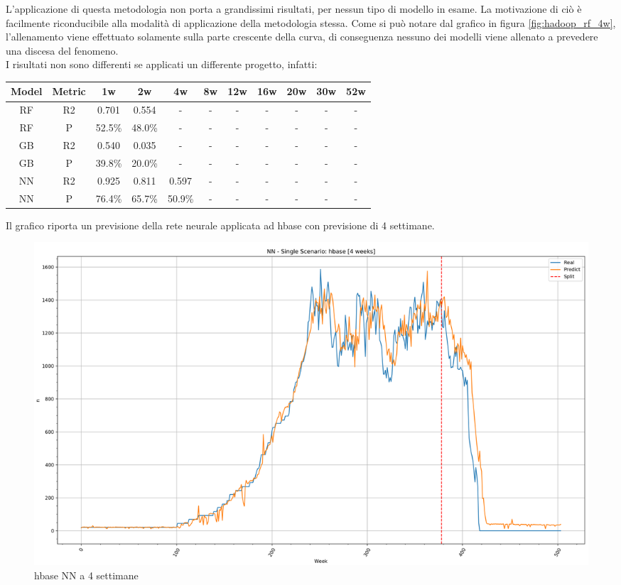 \documentclass[%
    corpo=12pt,
    twoside,
    oldstyle,
    autoretitolo,
    greek,
    evenboxes,
]{toptesi}
\begin{document}
L'applicazione di questa metodologia non porta a grandissimi risultati, per nessun tipo di modello in esame. La motivazione di ciò è facilmente riconducibile alla modalità di applicazione della metodologia stessa. Come si può notare dal grafico in figura \ref{fig:hadoop_rf_4w}, l'allenamento viene effettuato solamente sulla parte crescente della curva, di conseguenza nessuno dei modelli viene allenato a prevedere una discesa del fenomeno.\\
I risultati non sono differenti se applicati un differente progetto, infatti:
\begin{center}
   \label{tab:single_scen_hbase}
  \begin{tabular}{ |c|c|c|c|c|c|c|c|c|c|c| }
    \hline
    \textbf{Model} & \textbf{Metric} & \textbf{1w} & \textbf{2w} & \textbf{4w} & \textbf{8w} & \textbf{12w} & \textbf{16w} & \textbf{20w} & \textbf{30w}  & \textbf{52w} \\
    \hline
    \hline
    RF & R2 & 0.701 & 0.554 & - & - & - & - & - & - & -\\
    \hline
    RF & P & 52.5\% & 48.0\% & - & - & - & - & - & - & -\\
    \hline
    \hline
    GB & R2 & 0.540 & 0.035 & - & - & - & - & - & - & -\\
    \hline
    GB & P & 39.8\% & 20.0\% & - & - & - & - & - & - & -\\
    \hline
    \hline
    NN & R2 & 0.925 & 0.811 & 0.597 & - & - & - & - & - & -\\
    \hline
    NN & P & 76.4\% & 65.7\% & 50.9\% & - & - & - & - & - & -\\
    \hline
  \end{tabular}
\end{center}
Il grafico riporta un previsione della rete neurale applicata ad hbase con previsione di 4 settimane.
\begin{figure}[!ht]
  \includegraphics[width=\linewidth]{figure/hbase_nn_4w.png}
  \caption{hbase NN a 4 settimane}
  \label{fig:hbase_nn_4w}
\end{figure}
\end{document}
